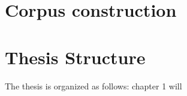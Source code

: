 \section{Corpus construction}  

\section{Thesis Structure}\label{section1.3} %
The thesis is organized as follows: chapter 1 will



